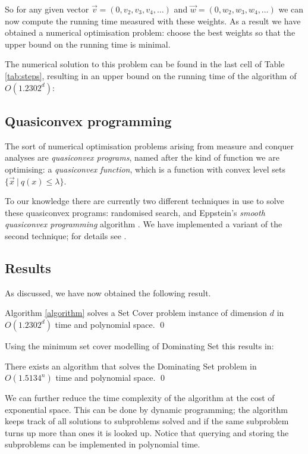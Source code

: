 \documentclass[fleqn]{stacs_proc}
\begin{document}
So for any given vector $\vec{v} = (0, v_2, v_3, v_4, \ldots)$ and $\vec{w} = (0, w_2, w_3, w_4, \ldots)$
we can now compute the running time measured with these weights.
As a result we have obtained a numerical optimisation problem: choose
the best weights so that the upper bound on the running time is minimal.

The numerical solution to this problem can be found in the last cell of Table \ref{tab:steps},
resulting in an upper bound on the running time of the algorithm of $O(1.2302^d)$:



\subsection{Quasiconvex programming}
The sort of numerical optimisation problems arising from
measure and conquer analyses are {\em quasiconvex programs}, named after
the kind of function we are optimising: a {\em quasiconvex function},
which is a function with convex level sets $\{ \vec{x} \:|\: q(x)\leq \lambda \}$.

To our knowledge there are currently two different techniques in use to solve
these quasiconvex programs: randomised search, and  Eppstein's \emph{smooth
quasiconvex programming} algorithm \cite{Eppstein04}.
We have implemented a variant of the second technique; for details see \cite{vanRooij06}.



\subsection{Results}
As discussed, we have now obtained the following result.
\begin{theorem}
Algorithm \ref{algorithm} solves a {\sc Set Cover}
problem instance of dimension $d$ in $O(1.2302^d)$ time and polynomial space.
\qed
\end{theorem}
Using the minimum set cover modelling of {\sc Dominating Set} this results in:
\begin{corollary}
There exists an algorithm that solves the {\sc Dominating Set} problem in $O(1.5134^n)$ time and polynomial space.
\qed
\end{corollary}

We can further reduce the time complexity of the algorithm at the cost of exponential space.
This can be done by dynamic programming; the algorithm keeps track of all solutions to
subproblems solved and if the same subproblem turns up more than ones it is looked up.
Notice that querying and storing the subproblems can be implemented in polynomial time.
\end{document}
